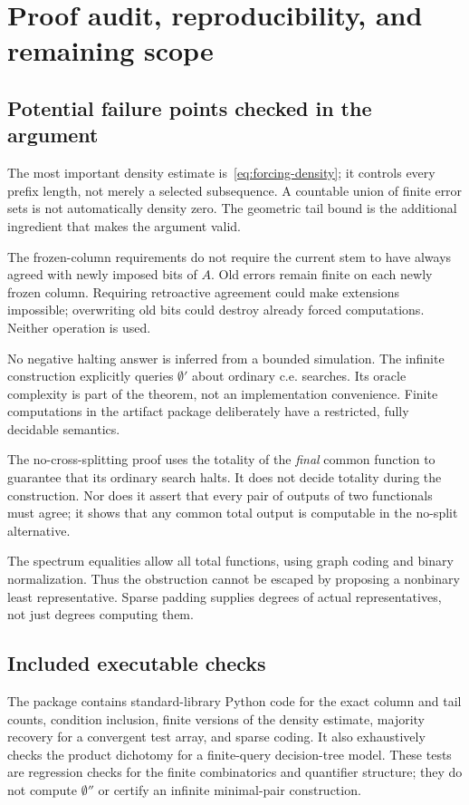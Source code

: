 \documentclass[11pt,a4paper]{article}
\theoremstyle{definition}\newtheorem{definition}[theorem]{Definition}
\theoremstyle{remark}\newtheorem{remark}[theorem]{Remark}
\begin{document}
\section{Proof audit, reproducibility, and remaining scope}
\label{sec:audit}
\subsection{Potential failure points checked in the argument}
The most important density estimate is~\eqref{eq:forcing-density}; it controls every prefix length, not merely a selected subsequence. A countable union of finite error sets is not automatically density zero. The geometric tail bound is the additional ingredient that makes the argument valid.

The frozen-column requirements do not require the current stem to have always agreed with newly imposed bits of $A$. Old errors remain finite on each newly frozen column. Requiring retroactive agreement could make extensions impossible; overwriting old bits could destroy already forced computations. Neither operation is used.

No negative halting answer is inferred from a bounded simulation. The infinite construction explicitly queries $\emptyset'$ about ordinary c.e. searches. Its oracle complexity is part of the theorem, not an implementation convenience. Finite computations in the artifact package deliberately have a restricted, fully decidable semantics.

The no-cross-splitting proof uses the totality of the \emph{final} common function to guarantee that its ordinary search halts. It does not decide totality during the construction. Nor does it assert that every pair of outputs of two functionals must agree; it shows that any common total output is computable in the no-split alternative.

The spectrum equalities allow all total functions, using graph coding and binary normalization. Thus the obstruction cannot be escaped by proposing a nonbinary least representative. Sparse padding supplies degrees of actual representatives, not just degrees computing them.

\subsection{Included executable checks}
The package contains standard-library Python code for the exact column and tail counts, condition inclusion, finite versions of the density estimate, majority recovery for a convergent test array, and sparse coding. It also exhaustively checks the product dichotomy for a finite-query decision-tree model. These tests are regression checks for the finite combinatorics and quantifier structure; they do not compute $\emptyset''$ or certify an infinite minimal-pair construction.
\end{document}
